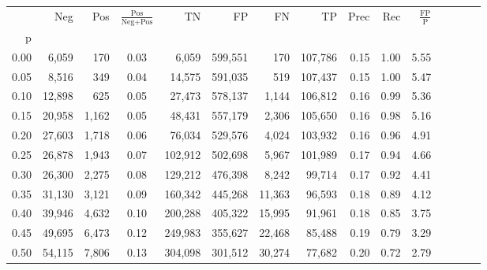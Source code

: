 \begin{tabular}{rrrcrrrrrrrrrrr}
\toprule
{} &     Neg &    Pos & $\frac{\text{Pos}}{\text{Neg}+\text{Pos}}$ &       TN &       FP &       FN &       TP &  Prec &   Rec & $\frac{\text{FP}}{\text{P}}$ \\
p    &         &        &                                            &          &          &          &          &       &       &                              \\
\midrule
0.00 &   6,059 &    170 &                                       0.03 &    6,059 &  599,551 &      170 &  107,786 &  0.15 &  1.00 &                         5.55 \\
0.05 &   8,516 &    349 &                                       0.04 &   14,575 &  591,035 &      519 &  107,437 &  0.15 &  1.00 &                         5.47 \\
0.10 &  12,898 &    625 &                                       0.05 &   27,473 &  578,137 &    1,144 &  106,812 &  0.16 &  0.99 &                         5.36 \\
0.15 &  20,958 &  1,162 &                                       0.05 &   48,431 &  557,179 &    2,306 &  105,650 &  0.16 &  0.98 &                         5.16 \\
0.20 &  27,603 &  1,718 &                                       0.06 &   76,034 &  529,576 &    4,024 &  103,932 &  0.16 &  0.96 &                         4.91 \\
0.25 &  26,878 &  1,943 &                                       0.07 &  102,912 &  502,698 &    5,967 &  101,989 &  0.17 &  0.94 &                         4.66 \\
0.30 &  26,300 &  2,275 &                                       0.08 &  129,212 &  476,398 &    8,242 &   99,714 &  0.17 &  0.92 &                         4.41 \\
0.35 &  31,130 &  3,121 &                                       0.09 &  160,342 &  445,268 &   11,363 &   96,593 &  0.18 &  0.89 &                         4.12 \\
0.40 &  39,946 &  4,632 &                                       0.10 &  200,288 &  405,322 &   15,995 &   91,961 &  0.18 &  0.85 &                         3.75 \\
0.45 &  49,695 &  6,473 &                                       0.12 &  249,983 &  355,627 &   22,468 &   85,488 &  0.19 &  0.79 &                         3.29 \\
0.50 &  54,115 &  7,806 &                                       0.13 &  304,098 &  301,512 &   30,274 &   77,682 &  0.20 &  0.72 &                         2.79 \\

\end{tabular}
